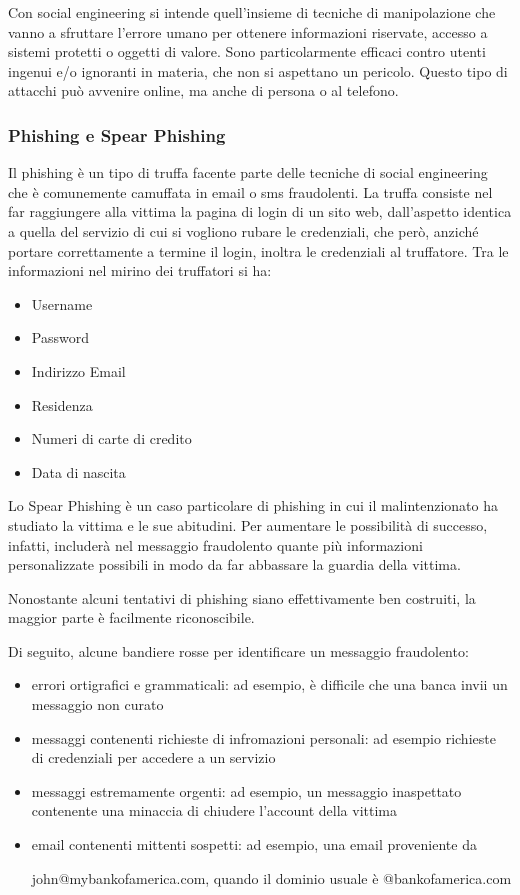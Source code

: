 Con social engineering si intende quell'insieme di tecniche di manipolazione che vanno a sfruttare l'errore umano per ottenere informazioni riservate, accesso a sistemi protetti o oggetti di valore. Sono particolarmente efficaci contro utenti ingenui e/o ignoranti in materia, che non si aspettano un pericolo. Questo tipo di attacchi può avvenire online, ma anche di persona o al telefono.

\subsubsection{Phishing e Spear Phishing}

Il phishing è un tipo di truffa facente parte delle tecniche di social engineering che è comunemente camuffata in email o sms fraudolenti. La truffa consiste nel far raggiungere alla vittima la pagina di login di un sito web, dall'aspetto identica a quella del servizio di cui si vogliono rubare le credenziali, che però, anziché portare correttamente a termine il login, inoltra le credenziali al truffatore.
Tra le informazioni nel mirino dei truffatori si ha:
\begin{itemize}
    \item Username
    \item Password
    \item Indirizzo Email
    \item Residenza
    \item Numeri di carte di credito
    \item Data di nascita
\end{itemize}

Lo Spear Phishing è un caso particolare di phishing in cui il malintenzionato ha studiato la vittima e le sue abitudini. Per aumentare le possibilità di successo, infatti, includerà nel messaggio fraudolento quante più informazioni personalizzate possibili in modo da far abbassare la guardia della vittima.

Nonostante alcuni tentativi di phishing siano effettivamente ben costruiti, la maggior parte è facilmente riconoscibile.

Di seguito, alcune bandiere rosse per identificare un messaggio fraudolento:

\begin{itemize}
    \item errori ortigrafici e grammaticali: ad esempio, è difficile che una banca invii un messaggio non curato
    \item messaggi contenenti richieste di infromazioni personali: ad esempio richieste di credenziali per accedere a un servizio
    \item messaggi estremamente orgenti: ad esempio, un messaggio inaspettato contenente una minaccia di chiudere l'account della vittima
    \item email contenenti mittenti sospetti: ad esempio, una email proveniente da

          john@mybankofamerica.com, quando il dominio usuale è @bankofamerica.com
\end{itemize}

